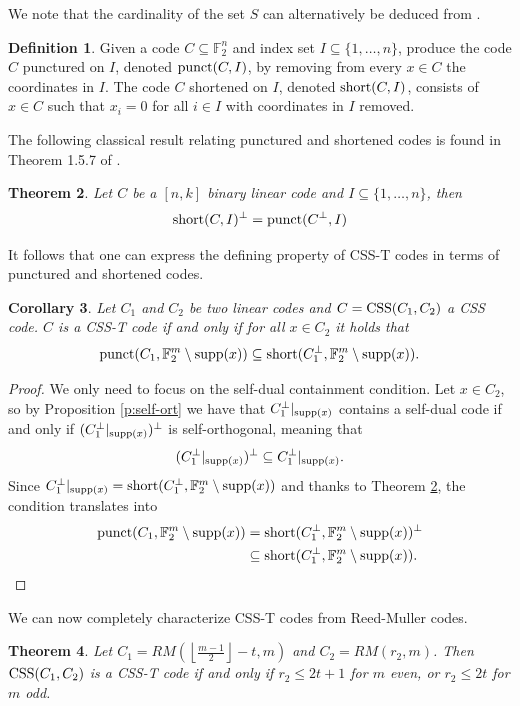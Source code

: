 \documentclass{amsart}
\newtheorem{theorem}{Theorem}
\newtheorem{corollary}[theorem]{Corollary}
\theoremstyle{definition}
\newtheorem{definition}[theorem]{Definition}
\newcommand{\F}{{\mathbb{F}}}
\newcommand{\floor}[1]{\left\lfloor#1\right\rfloor}
\newcommand{\short}{\textnormal{short}}
\newcommand{\punct}{\textnormal{punct}}
\newcommand{\supp}{\textnormal{supp}}
\newcommand{\CSS}{\textnormal{CSS}}
\begin{document}
We note that the cardinality of the set $S$ can alternatively be deduced from \cite[Proposition 2.5]{eamer-alberto}.

\begin{definition} 
Given a code $C\subseteq \F_2^n$ and index set $I\subseteq \{1,\dots, n\}$, produce the code $C$ punctured on $I$, denoted $\punct(C,I)$, by removing from every $x\in C$ the coordinates in $I$. The code $C$ shortened on $I$, denoted $\short(C,I)$, consists of $x\in C$ such that $x_i=0$ for all $i\in I$ with coordinates in $I$ removed. 
\end{definition}

The following classical result relating punctured and shortened codes is found in Theorem 1.5.7 of \cite{huffman_pless_2003}.
\begin{theorem}\label{t:short-punct}
Let $C$ be a $[n,k]$ binary linear code and $I\subseteq \{1,\dots,n\}$, then \[\short(C,I)^\perp=\punct(C^\perp,I)\]
\end{theorem}

It follows that one can express the defining property of CSS-T codes in terms of punctured and shortened codes.

\begin{corollary}
Let $C_1$ and $C_2$ be two linear codes and $C=\CSS(C_1,C_2)$ a CSS code. $C$ is a CSS-T code if and only if for all $x\in C_2$ it holds that \[\punct(C_1,\F_2^m\setminus \supp(x))\subseteq \short(C_1^\perp,\F_2^m\setminus \supp(x)).\]
\label{cor:short}
\end{corollary}

\begin{proof}
We only need to focus on the self-dual containment condition. Let $x\in C_2$, so  by Proposition \ref{p:self-ort} we have that $C_1^\perp|_{\supp(x)}$ contains a self-dual code if and only if $(C_1^\perp|_{\supp(x)})^\perp$ is self-orthogonal, meaning that \[(C_1^\perp|_{\supp(x)})^\perp\subseteq C_1^\perp|_{\supp(x)}.\] Since $C_1^\perp|_{\supp(x)}  =\short(C_1^\perp,\F_2^m\setminus {\supp(x)})$ and thanks to Theorem \ref{t:short-punct}, the condition translates into
\begin{align*}
    \punct(C_1,\F_2^m\setminus {\supp(x)})&=\short(C_1^\perp,\F_2^m\setminus {\supp(x)})^\perp\\ &\subseteq \short(C_1^\perp,\F_2^m\setminus {\supp(x)}).
\end{align*}

\end{proof}


We can now completely characterize CSS-T codes from Reed-Muller codes. 
\begin{theorem}\label{t:css-t}
Let $C_1=RM(\floor{\frac{m-1}{2}} - t, m)$ and  $C_2=RM(r_2,m)$. Then $\CSS(C_1,C_2)$ is a CSS-T code if and only if $r_2\leq 2t+1$ for $m$ even, or 
$r_2\leq 2t$ for $m$ odd.
\end{theorem}
\end{document}
